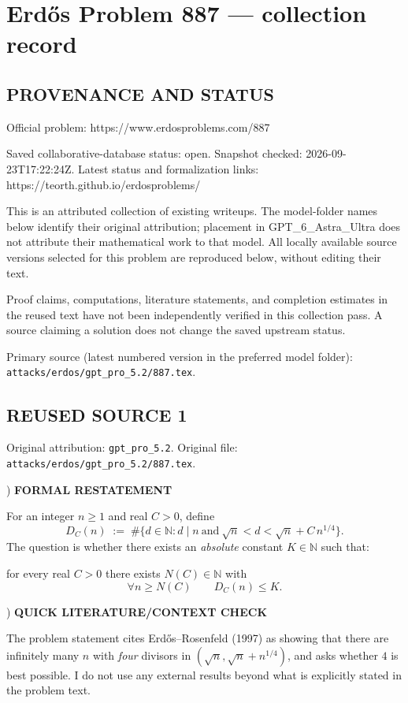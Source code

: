 \section*{Erd\H{o}s Problem 887 --- collection record}

\subsection*{PROVENANCE AND STATUS}
Official problem: https://www.erdosproblems.com/887

Saved collaborative-database status: open.
Snapshot checked: 2026-09-23T17:22:24Z.
Latest status and formalization links: https://teorth.github.io/erdosproblems/

This is an attributed collection of existing writeups. The model-folder names below identify their original attribution; placement in GPT\_6\_Astra\_Ultra does not attribute their mathematical work to that model. All locally available source versions selected for this problem are reproduced below, without editing their text.

Proof claims, computations, literature statements, and completion estimates in the reused text have not been independently verified in this collection pass. A source claiming a solution does not change the saved upstream status.

Primary source (latest numbered version in the preferred model folder): \texttt{attacks/erdos/gpt\_pro\_5.2/887.tex}.

\subsection*{REUSED SOURCE 1}
Original attribution: \texttt{gpt\_pro\_5.2}.
Original file: \texttt{attacks/erdos/gpt\_pro\_5.2/887.tex}.



) \textbf{FORMAL RESTATEMENT}

\noindent For an integer $n\ge 1$ and real $C>0$, define
\[
D_C(n) \;:=\; \#\Big\{d\in\mathbb{N}: d\mid n\ \text{and}\ \sqrt n< d < \sqrt n + C\,n^{1/4}\Big\}.
\]
The question is whether there exists an \emph{absolute} constant $K\in\mathbb{N}$ such that:

\noindent for every real $C>0$ there exists $N(C)\in\mathbb{N}$ with
\[
\forall n\ge N(C)\qquad D_C(n)\le K.
\]

) \textbf{QUICK LITERATURE/CONTEXT CHECK}

\noindent The problem statement cites Erd\H{o}s--Rosenfeld (1997) as showing that there are infinitely many $n$ with \emph{four} divisors in $(\sqrt n,\sqrt n+n^{1/4})$, and asks whether $4$ is best possible. I do not use any external results beyond what is explicitly stated in the problem text.

